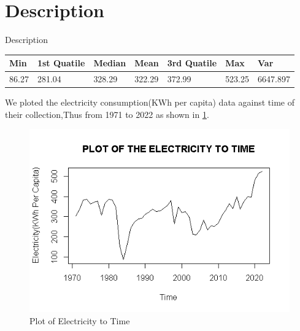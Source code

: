 \documentclass{beamer}
\begin{document}
	
	\section{Description}
	\begin{frame}{Description}
		\begin{table}
		\begin{tabular}{|l|l|l|l|l|l|l|}
\hline
Min & 1st Quatile & Median & Mean & 3rd Quatile & Max & Var \\ \hline
86.27 & 281.04 & 328.29 & 322.29 & 372.99 & 523.25 & 6647.897 \\ \hline
		\end{tabular}
		\end{table}
		
		\begin{block}{}
			\vspace{10pt}
			We ploted the electricity consumption(KWh per capita) data against time of their collection,Thus from 1971 to 2022 as shown in \figurename \ref{plot:data}.
			\vspace{10pt}
		\end{block}
		
	\end{frame}

	\begin{frame}
		\begin{figure}
			\begin{center}
				\includegraphics[width=0.9\linewidth]{images/image1}
			\end{center}
		
			\label{plot:data}
			\caption{Plot of Electricity to Time}
		\end{figure}
	\end{frame}
\end{document}
